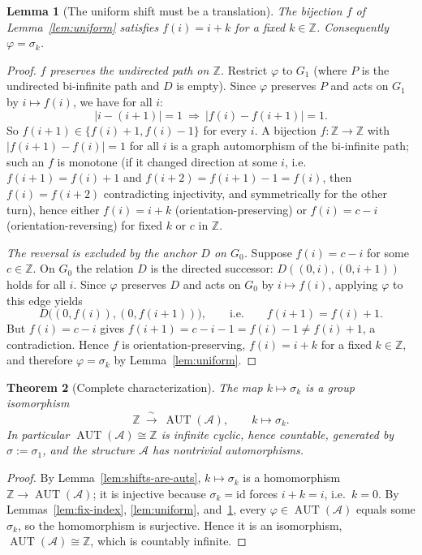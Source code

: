 \documentclass[12pt,fullpage]{article}
\newtheorem{theorem}{Theorem}[section]
\newtheorem{lemma}[theorem]{Lemma}
\theoremstyle{definition}
\newcommand{\A}{\mathcal{A}}
\newcommand{\Z}{{\mathbb{Z}}}
\newcommand{\AUT}{\operatorname{AUT}}
\renewcommand{\phi}{\varphi}
\begin{document}
\begin{lemma}[The uniform shift must be a translation]\label{lem:translation}
The bijection $f$ of Lemma~\ref{lem:uniform} satisfies $f(i)=i+k$ for a fixed
$k\in\Z$.  Consequently $\phi=\sigma_k$.
\end{lemma}

\begin{proof}
\emph{$f$ preserves the undirected path on $\Z$.}  Restrict $\phi$ to $G_1$
(where $P$ is the undirected bi-infinite path and $D$ is empty).  Since $\phi$
preserves $P$ and acts on $G_1$ by $i\mapsto f(i)$, we have for all $i$:
\[
|i-(i+1)|=1\ \Rightarrow\ |f(i)-f(i+1)|=1 .
\]
So $f(i+1)\in\{f(i)+1,f(i)-1\}$ for every $i$.  A bijection $f\colon\Z\to\Z$
with $|f(i+1)-f(i)|=1$ for all $i$ is a graph automorphism of the bi-infinite
path; such an $f$ is monotone (if it changed direction at some $i$, i.e.\
$f(i+1)=f(i)+1$ and $f(i+2)=f(i+1)-1=f(i)$, then $f(i)=f(i+2)$ contradicting
injectivity, and symmetrically for the other turn), hence either
$f(i)=i+k$ (orientation-preserving) or $f(i)=c-i$ (orientation-reversing)
for fixed $k$ or $c$ in $\Z$.

\emph{The reversal is excluded by the anchor $D$ on $G_0$.}  Suppose
$f(i)=c-i$ for some $c\in\Z$.  On $G_0$ the relation $D$ is the directed
successor: $D((0,i),(0,i+1))$ holds for all $i$.  Since $\phi$ preserves $D$
and acts on $G_0$ by $i\mapsto f(i)$, applying $\phi$ to this edge yields
\[
D\bigl((0,f(i)),(0,f(i+1))\bigr),\qquad\text{i.e.}\qquad f(i+1)=f(i)+1 .
\]
But $f(i)=c-i$ gives $f(i+1)=c-i-1=f(i)-1\ne f(i)+1$, a contradiction.
Hence $f$ is orientation-preserving, $f(i)=i+k$ for a fixed $k\in\Z$, and
therefore $\phi=\sigma_k$ by Lemma~\ref{lem:uniform}.
\end{proof}

\begin{theorem}[Complete characterization]\label{thm:aut}
The map $k\mapsto\sigma_k$ is a group isomorphism
\[
\Z\ \xrightarrow{\ \sim\ }\ \AUT(\A),\qquad k\mapsto\sigma_k .
\]
In particular $\AUT(\A)\cong\Z$ is infinite cyclic, hence \emph{countable},
generated by $\sigma:=\sigma_1$, and the structure $\A$ has nontrivial
automorphisms.
\end{theorem}

\begin{proof}
By Lemma~\ref{lem:shifts-are-auts}, $k\mapsto\sigma_k$ is a homomorphism
$\Z\to\AUT(\A)$; it is injective because $\sigma_k=\mathrm{id}$ forces
$i+k=i$, i.e.\ $k=0$.  By Lemmas~\ref{lem:fix-index}, \ref{lem:uniform},
and~\ref{lem:translation}, every $\phi\in\AUT(\A)$ equals some $\sigma_k$, so
the homomorphism is surjective.  Hence it is an isomorphism, $\AUT(\A)\cong\Z$,
which is countably infinite.
\end{proof}
\end{document}
